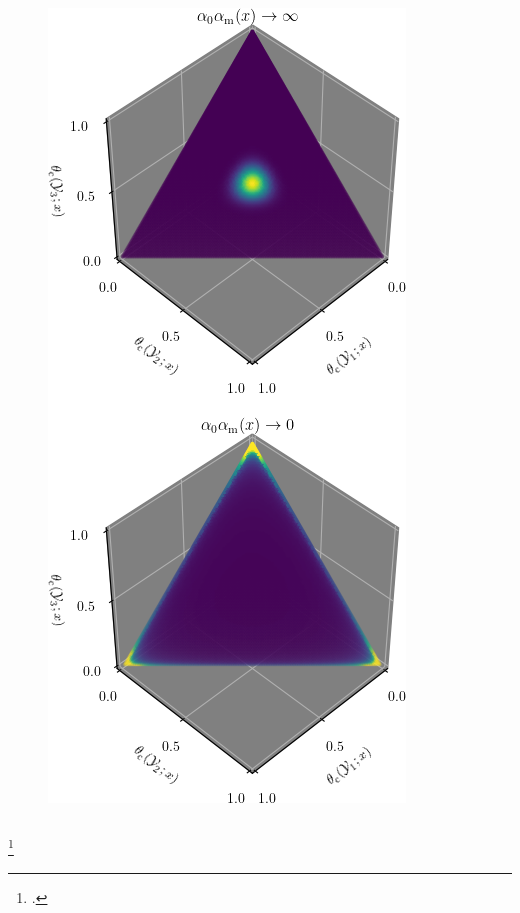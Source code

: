 \documentclass[aspectratio=169]{beamer}
\begin{document}
\begin{frame}
\begin{columns}[c]
\begin{column}{.2\linewidth}
\begin{figure}
\centering
\includegraphics[width=1\linewidth]{SSP_2021/presentation/dir_loc.png}
\end{figure}

\end{column}

\end{columns}

\vspace{-.75em}
\footcitetext{ferguson}


\end{frame}
\end{document}
